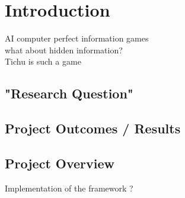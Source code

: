 \section{Introduction}
AI computer perfect information games \\
what about hidden information? \\
Tichu is such a game \\

\subsection{"Research Question"}


\subsection{Project Outcomes / Results}


\subsection{Project Overview}
Implementation of the framework ?\\
